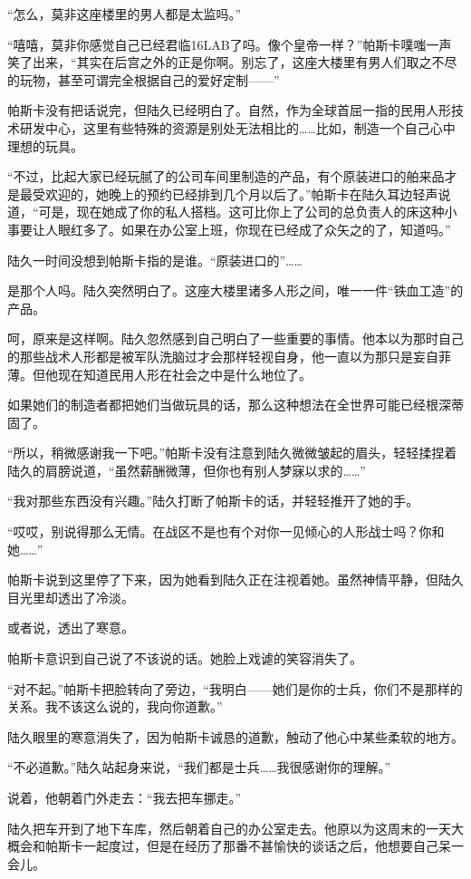 “怎么，莫非这座楼里的男人都是太监吗。”

“嘻嘻，莫非你感觉自己已经君临16LAB了吗。像个皇帝一样？”帕斯卡噗嗤一声笑了出来，“其实在后宫之外的正是你啊。别忘了，这座大楼里有男人们取之不尽的玩物，甚至可谓完全根据自己的爱好定制——”

帕斯卡没有把话说完，但陆久已经明白了。自然，作为全球首屈一指的民用人形技术研发中心，这里有些特殊的资源是别处无法相比的……比如，制造一个自己心中理想的玩具。

“不过，比起大家已经玩腻了的公司车间里制造的产品，有个原装进口的舶来品才是最受欢迎的，她晚上的预约已经排到几个月以后了。”帕斯卡在陆久耳边轻声说道，“可是，现在她成了你的私人搭档。这可比你上了公司的总负责人的床这种小事要让人眼红多了。如果在办公室上班，你现在已经成了众矢之的了，知道吗。”

陆久一时间没想到帕斯卡指的是谁。“原装进口的”……

是那个人吗。陆久突然明白了。这座大楼里诸多人形之间，唯一一件“铁血工造”的产品。

呵，原来是这样啊。陆久忽然感到自己明白了一些重要的事情。他本以为那时自己的那些战术人形都是被军队洗脑过才会那样轻视自身，他一直以为那只是妄自菲薄。但他现在知道民用人形在社会之中是什么地位了。

如果她们的制造者都把她们当做玩具的话，那么这种想法在全世界可能已经根深蒂固了。

“所以，稍微感谢我一下吧。”帕斯卡没有注意到陆久微微皱起的眉头，轻轻揉捏着陆久的肩膀说道，“虽然薪酬微薄，但你也有别人梦寐以求的……”

“我对那些东西没有兴趣。”陆久打断了帕斯卡的话，并轻轻推开了她的手。

“哎哎，别说得那么无情。在战区不是也有个对你一见倾心的人形战士吗？你和她……”

帕斯卡说到这里停了下来，因为她看到陆久正在注视着她。虽然神情平静，但陆久目光里却透出了冷淡。

或者说，透出了寒意。

帕斯卡意识到自己说了不该说的话。她脸上戏谑的笑容消失了。

“对不起。”帕斯卡把脸转向了旁边，“我明白——她们是你的士兵，你们不是那样的关系。我不该这么说的，我向你道歉。”

陆久眼里的寒意消失了，因为帕斯卡诚恳的道歉，触动了他心中某些柔软的地方。

“不必道歉。”陆久站起身来说，“我们都是士兵……我很感谢你的理解。”

说着，他朝着门外走去：“我去把车挪走。”

陆久把车开到了地下车库，然后朝着自己的办公室走去。他原以为这周末的一天大概会和帕斯卡一起度过，但是在经历了那番不甚愉快的谈话之后，他想要自己呆一会儿。

